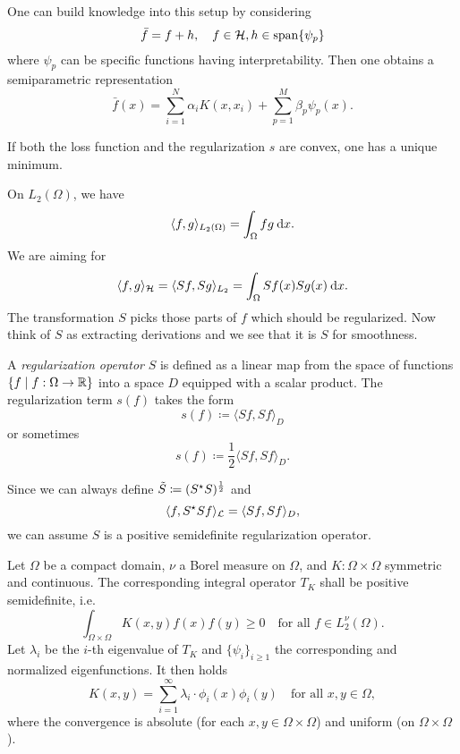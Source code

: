 \documentclass[../lecture-notes.tex]{subfiles}
\begin{document}
\begin{remark}
One can build knowledge into this setup by considering
\[
\bar{f} = f + h, \quad f \in \mathcal{H}, h \in \operatorname*{span}\{ \psi_p \}
\]
where $\psi_p$ can be specific functions having interpretability.
Then one obtains a semiparametric representation
\[
\bar{f}(x) = \sum_{i=1}^N \alpha_i K(x, x_i) + \sum_{p=1}^M \beta_p \psi_p(x).
\]
\end{remark}
\begin{remark}
If both the loss function and the regularization $s$ are convex, one has a unique minimum.
\end{remark}
On $L_2(\Omega)$, we have
\[
	\langle f, g \rangle_{L_2(\Omega)} = \int_\Omega fg \:\mathrm{d} x.
\]
We are aiming for
\[
	\langle f, g \rangle_{\mathcal{H}} = \langle Sf, Sg \rangle_{L_2} = \int_\Omega Sf(x) Sg(x) \:\mathrm{d} x.
\]
The transformation $S$ picks those parts of $f$ which should be regularized. Now think of $S$ as extracting derivations and we see that it is $S$ for smoothness.
\begin{definition} %
\label{thm:42}
A \emph{regularization operator} $S$ is defined as a linear map from the space of functions $\{ f \mid f : \Omega \to \mathbb{R} \}$ into a space $D$ equipped with a scalar product.
The regularization term $s(f)$ takes the form
\[
	s(f) \coloneqq \langle Sf, Sf \rangle_D
\]
or sometimes
\[
	s(f) \coloneqq \frac{1}{2} \langle Sf, Sf \rangle_D.
\]
\end{definition}
\begin{remark}
Since we can always define $\tilde{S} \coloneqq (S^{\star} S)^{\frac{1}{2}}$ and
\[
	\langle f, S^{\star} S f \rangle_{\mathcal{L}} = \langle Sf, Sf \rangle_D,
\]
we can assume $S$ is a positive semidefinite regularization operator.
\end{remark}
\begin{theorem} %
\label{thm:43}
Let $\Omega$ be a compact domain, $\nu$ a Borel measure on $\Omega$, and $K : \Omega \times \Omega$ symmetric and continuous.
The corresponding integral operator $T_K$ shall be positive semidefinite, i.e.
\[
	\int_{\Omega \times \Omega} K(x, y) f(x) f(y) \geq 0 \quad \text{for all } f \in L_2^\nu(\Omega).
\]
Let $\lambda_i$ be the $i$-th eigenvalue of $T_K$ and $\{ \psi_i \}_{i \geq 1}$ the corresponding and normalized eigenfunctions.
It then holds
\[
	K(x, y) = \sum_{i=1}^\infty \lambda_i \cdot \phi_i(x) \phi_i(y) \quad \text{for all } x, y \in \Omega,
\]
where the convergence is absolute (for each $x, y \in \Omega \times \Omega$) and uniform (on $\Omega \times \Omega$).
\end{theorem}
\end{document}
